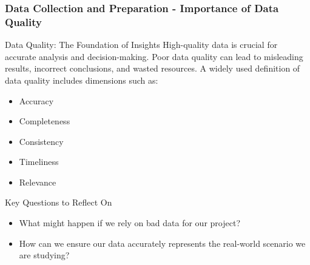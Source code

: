 \documentclass[aspectratio=169]{beamer}
\begin{document}
\begin{frame}[fragile]
  \frametitle{Data Collection and Preparation - Importance of Data Quality}
  
  \begin{block}{Data Quality: The Foundation of Insights}
    High-quality data is crucial for accurate analysis and decision-making. 
    Poor data quality can lead to misleading results, incorrect conclusions, and wasted resources.
    A widely used definition of data quality includes dimensions such as:
    \begin{itemize}
      \item Accuracy
      \item Completeness
      \item Consistency
      \item Timeliness
      \item Relevance
    \end{itemize}
  \end{block}

  \begin{block}{Key Questions to Reflect On}
    \begin{itemize}
      \item What might happen if we rely on bad data for our project?
      \item How can we ensure our data accurately represents the real-world scenario we are studying?
    \end{itemize}
  \end{block}

\end{frame}
\end{document}
